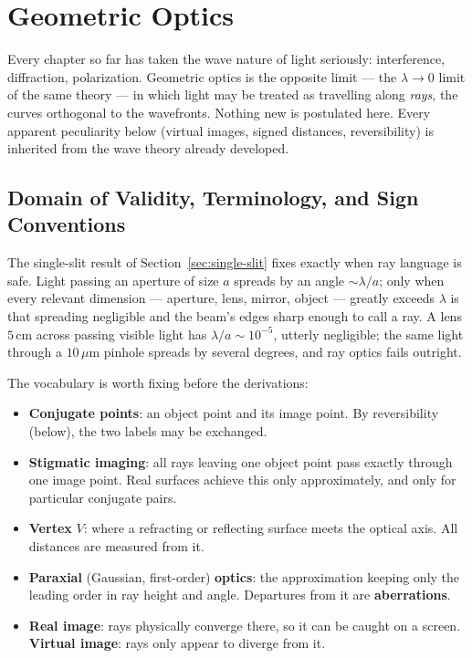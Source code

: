 \chapter{Geometric Optics}

Every chapter so far has taken the wave nature of light seriously: interference, diffraction, polarization. Geometric optics is the opposite limit --- the $\lambda \to 0$ limit of the same theory --- in which light may be treated as travelling along \emph{rays}, the curves orthogonal to the wavefronts. Nothing new is postulated here. Every apparent peculiarity below (virtual images, signed distances, reversibility) is inherited from the wave theory already developed.

\section{Domain of Validity, Terminology, and Sign Conventions}

The single-slit result of Section~\ref{sec:single-slit} fixes exactly when ray language is safe. Light passing an aperture of size $a$ spreads by an angle $\sim\lambda/a$; only when every relevant dimension --- aperture, lens, mirror, object --- greatly exceeds $\lambda$ is that spreading negligible and the beam's edges sharp enough to call a ray. A lens $5\,$cm across passing visible light has $\lambda/a \sim 10^{-5}$, utterly negligible; the same light through a $10\,\mu$m pinhole spreads by several degrees, and ray optics fails outright.

The vocabulary is worth fixing before the derivations:
\begin{itemize}
    \item \textbf{Conjugate points}: an object point and its image point. By reversibility (below), the two labels may be exchanged.
    \item \textbf{Stigmatic imaging}: all rays leaving one object point pass exactly through one image point. Real surfaces achieve this only approximately, and only for particular conjugate pairs.
    \item \textbf{Vertex} $V$: where a refracting or reflecting surface meets the optical axis. All distances are measured from it.
    \item \textbf{Paraxial} (Gaussian, first-order) \textbf{optics}: the approximation keeping only the leading order in ray height and angle. Departures from it are \textbf{aberrations}.
    \item \textbf{Real image}: rays physically converge there, so it can be caught on a screen. \textbf{Virtual image}: rays only appear to diverge from it.
\end{itemize}

